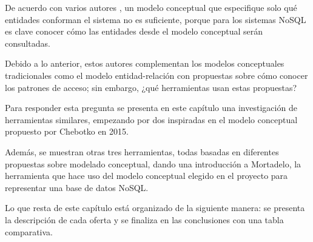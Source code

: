 De acuerdo con varios autores \cite{chebotko_big_2015,de_lima_workload-driven_2015,mior_nose_2017}, un modelo conceptual que especifique solo qué entidades conforman el sistema no es suficiente, porque para los sistemas NoSQL es clave conocer cómo las entidades desde el modelo conceptual serán consultadas.


Debido a lo anterior, estos autores complementan los modelos conceptuales tradicionales como el modelo entidad-relación con propuestas sobre cómo conocer los patrones de acceso; sin embargo, ¿qué herramientas usan estas propuestas?


Para responder esta pregunta se presenta en este capítulo una investigación de herramientas similares, empezando por dos inspiradas en el modelo conceptual propuesto por Chebotko en 2015.


Además, se muestran otras tres herramientas, todas basadas en diferentes propuestas sobre modelado conceptual, dando una introducción a Mortadelo, la herramienta que hace uso del modelo conceptual elegido en el proyecto para representar una base de datos NoSQL.


Lo que resta de este capítulo está organizado de la siguiente manera: se presenta la descripción de cada oferta y se finaliza en las conclusiones con una tabla comparativa.







